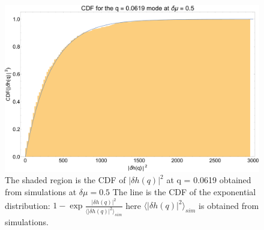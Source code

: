 \documentclass[amsmath,preprintnumbers,10pt,nofootinbib,prl,twocolumn]{revtex4-1}
\begin{document}
\begin{figure}
\centering
\includegraphics[scale=0.2]{CDFatdeltamu0d7formodeq=0d0619.pdf}
\caption{The shaded region is the CDF of $|\delta h(q)|^2$ at q = 0.0619 obtained from simulations at $\delta\mu=0.5$ The line is the CDF of the exponential distribution: $1-\exp{\frac{|\delta h(q)|^2}{\langle |\delta h(q)|^2\rangle_{sim}}}$ here $\langle |\delta h(q)|^2\rangle_{sim}$ is obtained from simulations. }  \label{fig:expdistributionaoutofeq}
\end{figure}
\end{document}
